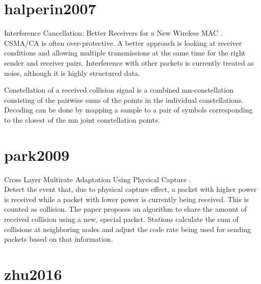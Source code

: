 
\section{halperin2007}

Interference Cancellation: Better Receivers for a New Wireless MAC \cite{halperin2007}.\\

CSMA/CA is often over-protective. A better approach is looking at receiver conditions and allowing multiple transmissions at the same time for the right sender and receiver pairs. Interference with other packets is currently treated as noise, although it is highly structured data.

Constellation of a received collision signal is a combined mn-constellation consisting of the pairwise sums of the points in the individual constellations. Decoding can be done by mapping a sample to a pair of symbols corresponding to the closest of the mn joint constellation points.



\section{park2009}

Cross Layer Multirate Adaptation Using Physical Capture \cite{park2009}.\\

Detect the event that, due to physical capture effect, a packet with higher power is received while a packet with lower power is currently being received. This is counted as collision. The paper proposes an algorithm to share the amount of received collision using a new, special packet. Stations calculate the sum of collisions at neighboring nodes and adjust the code rate being used for sending packets based on that information.



\section{zhu2016}

